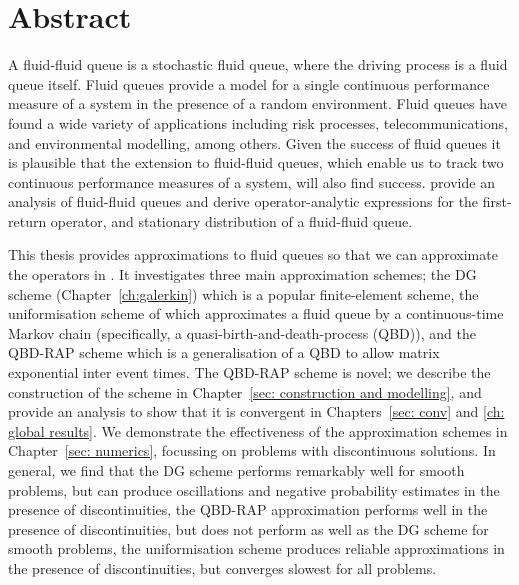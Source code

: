 \chapter{Abstract}
\label{ch:abstract}
A fluid-fluid queue is a stochastic fluid queue, where the driving process is a fluid queue itself. Fluid queues provide a model for a single continuous performance measure of a system in the presence of a random environment. Fluid queues have found a wide variety of applications including risk processes, telecommunications, and environmental modelling, among others. Given the success of fluid queues it is plausible that the extension to fluid-fluid queues, which enable us to track two continuous performance measures of a system, will also find success. \cite{bo2014} provide an analysis of fluid-fluid queues and derive operator-analytic expressions for the first-return operator, and stationary distribution of a fluid-fluid queue.

This thesis provides approximations to fluid queues so that we can approximate the operators in \cite{bo2014}. It investigates three main approximation schemes; the DG scheme (Chapter~\ref{ch:galerkin}) which is a popular finite-element scheme, the uniformisation scheme of \cite{bo2013} which approximates a fluid queue by a continuous-time Markov chain (specifically, a quasi-birth-and-death-process (QBD)), and the QBD-RAP scheme which is a generalisation of a QBD to allow matrix exponential inter event times. The QBD-RAP scheme is novel; we describe the construction of the scheme in Chapter~\ref{sec: construction and modelling}, and provide an analysis to show that it is convergent in Chapters~\ref{sec: conv} and \ref{ch: global results}. We demonstrate the effectiveness of the approximation schemes in Chapter~\ref{sec: numerics}, focussing on problems with discontinuous solutions. In general, we find that the DG scheme performs remarkably well for smooth problems, but can produce oscillations and negative probability estimates in the presence of discontinuities, the QBD-RAP approximation performs well in the presence of discontinuities, but does not perform as well as the DG scheme for smooth problems, the uniformisation scheme produces reliable approximations in the presence of discontinuities, but converges slowest for all problems. 


